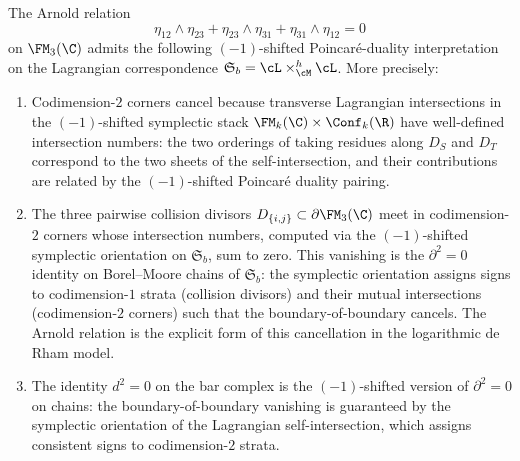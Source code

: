 \begin{conjecture}
\label{conj:arnold-shifted-poincare}
The Arnold relation
\[
 \eta_{12}\wedge\eta_{23} + \eta_{23}\wedge\eta_{31} + \eta_{31}\wedge\eta_{12} = 0
\]
on\/ $\FM_3(\C)$ admits the following $(-1)$-shifted
Poincar\'{e}-duality interpretation on the Lagrangian correspondence
$\mathfrak{S}_b = \cL \times_{\cM}^h \cL$.
More precisely:
\begin{enumerate}[label=\textup{(\roman*)}]
\item Codimension-$2$ corners cancel because transverse Lagrangian intersections in the $(-1)$-shifted symplectic stack\/ $\FM_k(\C) \times \Conf_k(\R)$ have well-defined intersection numbers: the two orderings of taking residues along\/ $D_S$ and\/ $D_T$ correspond to the two sheets of the self-intersection, and their contributions are related by the $(-1)$-shifted Poincar\'{e} duality pairing.
\item The three pairwise collision divisors\/ $D_{\{i,j\}} \subset \partial\FM_3(\C)$ meet in codimension-$2$ corners whose intersection numbers, computed via the $(-1)$-shifted symplectic orientation on\/ $\mathfrak{S}_b$, sum to zero. This vanishing is the $\partial^2=0$ identity on Borel--Moore chains of\/ $\mathfrak{S}_b$: the symplectic orientation assigns signs to codimension-$1$ strata (collision divisors) and their mutual intersections (codimension-$2$ corners) such that the boundary-of-boundary cancels. The Arnold relation is the explicit form of this cancellation in the logarithmic de Rham model.
\item The identity\/ $d^2 = 0$ on the bar complex is the $(-1)$-shifted version of\/ $\partial^2 = 0$ on chains: the boundary-of-boundary vanishing is guaranteed by the symplectic orientation of the Lagrangian self-intersection, which assigns consistent signs to codimension-$2$ strata.
\end{enumerate}
\end{conjecture}

